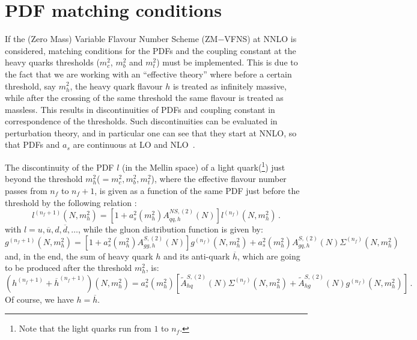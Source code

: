 \documentclass[10pt,a4paper]{article}
\begin{document}
\tableofcontents
\newpage

\section{PDF matching conditions}

If the (Zero Mass) Variable Flavour Number Scheme (ZM$-$VFNS) at NNLO
is considered, matching conditions for the PDFs and the coupling
constant at the heavy quarks thresholds ($m_c^2$, $m_b^2$ and $m_t^2$)
must be implemented. This is due to the fact that we are working with
an ``effective theory'' where before a certain threshold, say $m_h^2$,
the heavy quark flavour $h$ is treated as infinitely massive, while
after the crossing of the same threshold the same flavour is treated
as massless. This results in discontinuities of PDFs and coupling
constant in correspondence of the thresholds. Such discontinuities can
be evaluated in perturbation theory, and in particular one can see
that they start at NNLO, so that PDFs and $a_s$ are continuous at LO
and NLO~\cite{Buza:1996wv}.

The discontinuity of the PDF $l$ (in the Mellin space) of a light
quark(\footnote{Note that the light quarks run from $1$ to $n_f$.})
just beyond the threshold $m_h^2$($=m_c^2,m_b^2,m_t^2$), where the
effective flavour number passes from $n_f$ to $n_f+1$, is given as a
function of the same PDF just before the threshold by the following
relation \cite{Vogt:2004ns}:
\begin{equation}\label{eq:lightqmc}
l^{(n_f+1)}(N,m_h^2)=[1+a_s^2(m_h^2)A_{qq,h}^{N\!S,(2)}(N)]l^{(n_f)}(N,m_h^2)\,.
\end{equation}
with $l=u,\overline{u},d,\overline{d},\dots$, while the gluon
distribution function is given by:
\begin{equation}\label{gluon}
\displaystyle g^{(n_f+1)}(N,m_h^2)=[1+a_s^2(m_h^2)A_{gg,h}^{S,(2)}(N)]g^{(n_f)}(N,m_h^2)+a_s^2(m_h^2)A^{S,(2)}_{gq,h}(N)\Sigma^{(n_f)}(N,m^2_h)
\end{equation}
and, in the end, the sum of heavy quark $h$ and its anti-quark
$\overline{h}$, which are going to be produced after the threshold
$m_h^2$, is:
\begin{equation}\label{eq:heavyqmc}
(h^{(n_f+1)}+\overline{h}^{(n_f+1)})(N,m_h^2)=a_s^2(m_h^2)[\tilde{A}^{S,(2)}_{hq}(N)\Sigma^{(n_f)}(N,m_h^2)+\tilde{A}^{S,(2)}_{hg}(N)g^{(n_f)}(N,m_h^2)]\,.
\end{equation}
Of course, we have $h=\overline{h}$. 
\end{document}
